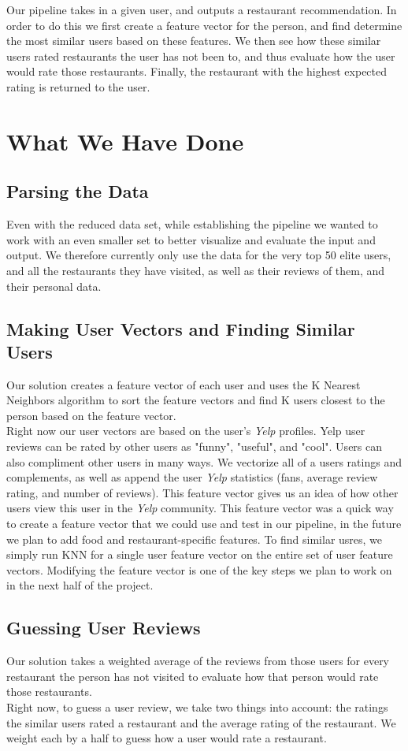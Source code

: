 \documentclass[10pt,twocolumn,letterpaper]{article}
\begin{document}
Our pipeline takes in a given user, and outputs a restaurant recommendation. In order to do this we first create a feature vector for the person, and find determine the most similar users based on these features. We then see how these similar users rated restaurants the user has not been to, and thus evaluate how the user would rate those restaurants. Finally, the restaurant with the highest expected rating is returned to the user.

\section{What We Have Done}
\subsection{Parsing the Data}
Even with the reduced data set, while establishing the pipeline we wanted to work with an even smaller set to better visualize and evaluate the input and output. We therefore currently only use the data for the very top 50 elite users, and all the restaurants they have visited, as well as their reviews of them, and their personal data.
\subsection{Making User Vectors and Finding Similar Users}
Our solution creates a feature vector of each user and uses the K Nearest Neighbors algorithm to sort the feature vectors and find K users closest to the person based on the feature vector.
\\[0.5em]
\indent Right now our user vectors are based on the user's \textit{Yelp} profiles. Yelp user reviews can be rated by other users as "funny", "useful", and "cool". Users can also compliment other users in many ways. We vectorize all of a users ratings and complements, as well as append the user \textit{Yelp} statistics (fans, average review rating, and number of reviews). This feature vector gives us an idea of how other users view this user in the \textit{Yelp} community. This feature vector was a quick way to create a feature vector that we could use and test in our pipeline, in the future we plan to add food and restaurant-specific features. To find similar usres, we simply run KNN for a single user feature vector on the entire set of user feature vectors. Modifying the feature vector is one of the key steps we plan to work on in the next half of the project.
\subsection{Guessing User Reviews}
Our solution takes a weighted average of the reviews from those users for every restaurant the person has not visited to evaluate how that person would rate those restaurants.
\\[0.5em]
\indent Right now, to guess a user review, we take two things into account: the ratings the similar users rated a restaurant and the average rating of the restaurant. We weight each by a half to guess how a user would rate a restaurant.
\end{document}
